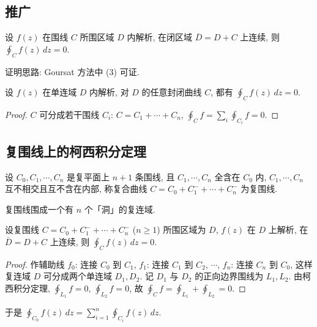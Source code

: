 \documentclass[theorem=false,mathfont=none,openany,sub3section]{easybook}
\begin{document}
\subsection{推广}

设 $f(z)$ 在围线 $C$ 所围区域 $D$ 内解析, 在闭区域 $\overline{D}=D+C$ 上连续, 则 $\oint_{C}f(z)\,dz=0$.

证明思路: Goursat 方法中 (3) 可证.

\begin{corollary}
  设 $f(z)$ 在单连域 $D$ 内解析, 对 $D$ 的任意封闭曲线 $C$, 都有 $\oint_{C}f(z)\,dz=0$.
\end{corollary}

\begin{proof}
  $C$ 可分成若干围线 $C_{i}$: $C=C_{1}+\cdots+C_{n}$, $\oint_{C}f=\sum_{i}\oint_{C_{i}}f=0$.
\end{proof}

\subsection{复围线上的柯西积分定理}

\begin{definition}
  设 $C_{0},C_{1},\cdots,C_{n}$ 是复平面上 $n+1$ 条围线, 且 $C_{1},\cdots,C_{n}$ 全含在 $C_{0}$ 内, $C_{1},\cdots,C_{n}$ 互不相交且互不含在内部, 称复合曲线 $C=C_{0}+C_{1}^{-}+\cdots+C_{n}^{-}$ 为复围线.
\end{definition}

\begin{remark}
  复围线围成一个有 $n$ 个「洞」的复连域.
\end{remark}

\begin{theorem}
  设复围线 $C=C_{0}+C_{1}^{-}+\cdots+C_{n}^{-}$ ($n\geq1$) 所围区域为 $D$, $f(z)$ 在 $D$ 上解析, 在 $\overline{D}=D+C$ 上连续, 则 $\oint_{C}f(z)\,dz=0$.
\end{theorem}

\begin{proof}
  作辅助线 $f_{0}$: 连接 $C_{0}$ 到 $C_{1}$, $f_{1}$: 连接 $C_{1}$ 到 $C_{2}$, $\cdots$, $f_{n}$: 连接 $C_{n}$ 到 $C_{0}$, 这样复连域 $D$ 可分成两个单连域 $D_{1},D_{2}$. 记 $D_{1}$ 与 $D_{2}$ 的正向边界围线为 $L_{1},L_{2}$. 由柯西积分定理, $\oint_{L_{1}}f=0$, $\oint_{L_{2}}f=0$, 故 $\oint_{C}f=\oint_{L_{1}}+\oint_{L_{2}}=0$.
\end{proof}

于是 $\oint_{C_{0}}f(z)\,dz=\sum_{i=1}^{n}\oint_{C_{i}}f(z)\,dz$.
\end{document}
